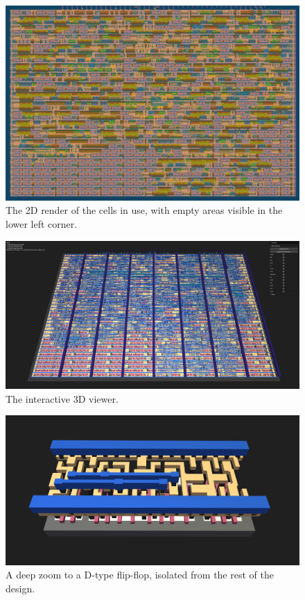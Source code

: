 \begin{figure}[htp]
\centering
\includegraphics[width=\columnwidth]{./Figs/gh action gds layout.png}
\caption{The 2D render of the cells in use, with empty areas visible in the lower left corner.}
\label{fig:render_cells_in_use}
\end{figure}

\begin{figure}[htp]
\centering
\includegraphics[width=\columnwidth]{./Figs/gh action gds 3d view.png}
\caption{The interactive 3D viewer.}
\label{fig:interactive_3D_viewer}
\end{figure}

\begin{figure}[htp]
\centering
\includegraphics[width=\columnwidth]{./Figs/gh action d type flop 3d closeup.png}
\caption{A deep zoom to a D-type flip-flop, isolated from the rest of the design.}
\label{fig:zoom_d_flip_flop}
\end{figure}

